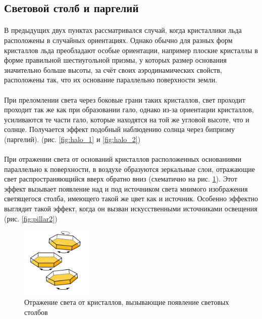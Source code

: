 \documentclass[a4paper,12pt]{article} %
\begin{document}
\subsection{Световой столб и паргелий}

\paragraph{} В предыдущих двух пунктах рассматривался случай, когда кристаллики льда расположены в случайных ориентациях. Однако обычно для разных форм кристаллов льда преобладают особые ориентации, например плоские кристаллы в форме правильной шестиугольной призмы, у которых размер основания значительно больше высоты, за счёт своих аэродинамических свойств, расположены так, что их основание параллельно поверхности земли. 

\paragraph{} При преломлении света через боковые грани таких кристаллов, свет проходит проходит так же как при образовании гало, однако из-за ориентации кристаллов, усиливаются те части гало, которые находятся на той же угловой высоте, что и солнце. Получается эффект подобный наблюдению солнца через бипризму (паргелий). (рис. \ref{fig:halo_1} и \ref{fig:halo_2})

\paragraph{}  При отражении света от оснований кристаллов расположенных основаниями параллельно к поверхности, в воздухе образуются зеркальные слои, отражающие свет распространяющийся вверх обратно вниз (схематично на рис. \ref{fig:pillar1}). Этот эффект вызывает появление над и под источником света мнимого изображения светящегося столба, имеющего такой же цвет как и источник. Особенно эффектно выглядит такой эффект, когда он вызван искусственными источниками освещения (рис. \ref{fig:pillar2})
\begin{figure}
\centering
\includegraphics[width=0.3\textwidth]{light_pillar.png}
\caption{\centering Отражение света от кристаллов, вызывающие появление световых столбов}
\label{fig:pillar1}
\end{figure}
\end{document}
